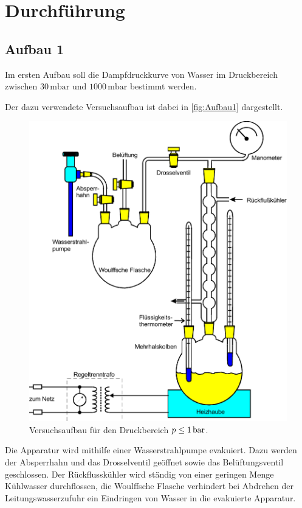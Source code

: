 \section{Durchführung}
\label{sec:Durchführung}

\subsection{Aufbau 1}

Im ersten Aufbau soll die Dampfdruckkurve von Wasser im Druckbereich zwischen $30 \,\unit{\milli\bar}$
und $1000 \,\unit{\milli\bar}$ bestimmt werden.

Der dazu verwendete Versuchsaufbau ist dabei in \autoref{fig:Aufbau1} dargestellt.

\begin{figure}[H]
    \centering
    \includegraphics[scale=0.65]{Aufbau1.pdf}
    \caption{Versuchsaufbau für den Druckbereich $p \leq 1 \,\unit{\Bar}$\cite{ap06}.}
    \label{fig:Aufbau1}
\end{figure}

Die Apparatur wird mithilfe einer Wasserstrahlpumpe evakuiert.
Dazu werden der Absperrhahn und das Drosselventil geöffnet sowie das Belüftungsventil geschlossen.
Der Rückflusskühler wird ständig von einer geringen Menge Kühlwasser durchflossen, die Woulffsche Flasche
verhindert bei Abdrehen der Leitungswasserzufuhr ein Eindringen von Wasser in die evakuierte Apparatur. \\


